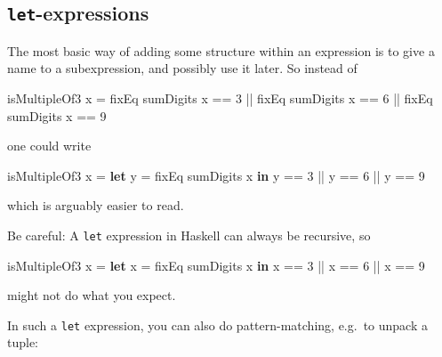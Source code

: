 \documentclass[11pt,
  american,
  DIV13]{article}
\newenvironment{Shaded}{}{}
\newcommand{\DecValTok}[1]{\textcolor[rgb]{0.25,0.63,0.44}{#1}}
\newcommand{\KeywordTok}[1]{\textcolor[rgb]{0.00,0.44,0.13}{\textbf{#1}}}
\newcommand{\NormalTok}[1]{#1}
\newcommand{\OperatorTok}[1]{\textcolor[rgb]{0.40,0.40,0.40}{#1}}
\newcommand{\OtherTok}[1]{\textcolor[rgb]{0.00,0.44,0.13}{#1}}
\begin{document}
\hypertarget{let-expressions}{%
\subsection{\texorpdfstring{\texttt{let}-expressions}{let-expressions}}\label{let-expressions}}

The most basic way of adding some structure within an expression is to
give a name to a subexpression, and possibly use it later. So instead of

\begin{Shaded}
\begin{Highlighting}[]
\NormalTok{isMultipleOf3 x }\OtherTok{=}\NormalTok{ fixEq sumDigits x }\OperatorTok{==} \DecValTok{3} \OperatorTok{||}\NormalTok{ fixEq sumDigits x }\OperatorTok{==} \DecValTok{6} \OperatorTok{||}
\NormalTok{ fixEq sumDigits x }\OperatorTok{==} \DecValTok{9}
\end{Highlighting}
\end{Shaded}

one could write

\begin{Shaded}
\begin{Highlighting}[]
\NormalTok{isMultipleOf3 x }\OtherTok{=}
  \KeywordTok{let}\NormalTok{ y }\OtherTok{=}\NormalTok{ fixEq sumDigits x}
  \KeywordTok{in}\NormalTok{ y }\OperatorTok{==} \DecValTok{3} \OperatorTok{||}\NormalTok{ y }\OperatorTok{==} \DecValTok{6} \OperatorTok{||}\NormalTok{ y }\OperatorTok{==} \DecValTok{9}
\end{Highlighting}
\end{Shaded}

which is arguably easier to read.

Be careful: A \texttt{let} expression in Haskell can always be
recursive, so

\begin{Shaded}
\begin{Highlighting}[]
\NormalTok{isMultipleOf3 x }\OtherTok{=}
  \KeywordTok{let}\NormalTok{ x }\OtherTok{=}\NormalTok{ fixEq sumDigits x}
  \KeywordTok{in}\NormalTok{ x }\OperatorTok{==} \DecValTok{3} \OperatorTok{||}\NormalTok{ x }\OperatorTok{==} \DecValTok{6} \OperatorTok{||}\NormalTok{ x }\OperatorTok{==} \DecValTok{9}
\end{Highlighting}
\end{Shaded}

might not do what you expect.

In such a \texttt{let} expression, you can also do pattern-matching,
e.g.~to unpack a tuple:
\end{document}
